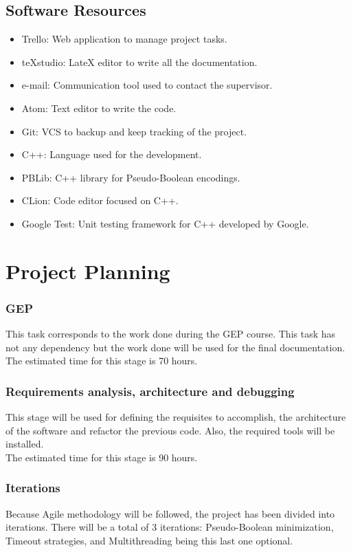 \subsection{Software Resources}
\begin{itemize}
	\item Trello: Web application to manage project tasks.
	\item teXstudio: LateX editor to write all the documentation.
	\item e-mail: Communication tool used to contact the supervisor. 
	\item Atom: Text editor to write the code.
	\item Git: VCS to backup and keep tracking of the project.
	\item C++: Language used for the development.
	\item PBLib: C++ library for Pseudo-Boolean encodings.
	\item CLion: Code editor focused on C++.
	\item Google Test: Unit testing framework for C++ developed by Google.
\end{itemize}

\section{Project Planning}

\subsubsection{GEP}
This task corresponds to the work done during the GEP course. This task has not any dependency but the work done will be used for the final documentation.\\

The estimated time for this stage is 70 hours.
\subsubsection{Requirements analysis, architecture and debugging}
This stage will be used for defining the requisites to accomplish, the architecture of the software and refactor the previous code. Also, the required tools will be installed. \\

The estimated time for this stage is 90 hours.
\subsubsection{Iterations}
Because Agile methodology will be followed, the project has been divided into iterations. There will be a total of 3 iterations: Pseudo-Boolean minimization, Timeout strategies, and Multithreading being this last one optional. \\

